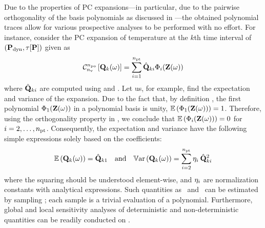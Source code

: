 Due to the properties of PC expansions---in particular, due to the pairwise orthogonality of the basis polynomials as discussed in ---the obtained polynomial traces allow for various prospective analyses to be performed with no effort. For instance, consider the PC expansion of temperature at the $k$th time interval of $\profilePdyn$ given as
\begin{equation} \elabel{pc-k}
  \oPC{\nvars}{\pcorder}{\vTO_k(\o)} = \sum_{i = 1}^{\pcterms} \pcc{\vTO}_{ki} \pcb_i(\vZ(\o))
\end{equation}
where $\hat{\mathbf{Q}}_{ki}$ are computed using  and . Let us, for example, find the expectation and variance of the expansion.
Due to the fact that, by definition \cite{xiu2010}, the first polynomial $\Phi_1(\mathbf{Z}(\omega))$ in a polynomial basis is unity, $\mathbb{E}\left(\Phi_1(\mathbf{Z}(\omega))\right) = 1$.
Therefore, using the orthogonality property in , we conclude that $\mathbb{E}\left(\Phi_i(\mathbf{Z}(\omega))\right) = 0$ for $i = 2, \dotsc, {n_\text{pt}}$.
Consequently, the expectation and variance have the following simple expressions solely based on the coefficients:
\begin{equation} \elabel{pc-moments}
  \oExp{\vTO_k(\o)} = \pcc{\vTO}_{k1} \hspace{1em} \text{and} \hspace{1em} \oVar{\vTO_k(\o)} = \sum_{i = 2}^{\pcterms} \pcn_i \: \pcc{\vTO}_{ki}^2
\end{equation}
where the squaring should be understood element-wise, and $\eta_i$ are normalization constants with analytical expressions. Such quantities as \cdfs\ and \pdfs\ can be estimated by sampling ; each sample is a trivial evaluation of a polynomial. Furthermore, global and local sensitivity analyses of deterministic and non-deterministic quantities can be readily conducted on .
